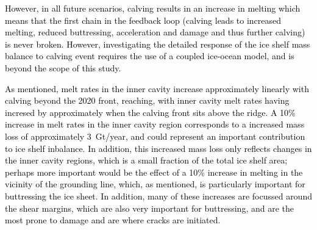 \documentclass[draft]{agujournal2019}
\newcommand{\blue}[1]{\textcolor{blue}{#1}}
\newcommand{\red}[1]{\textcolor{red}{#1}}
\renewcommand{\blue}[1]{{\textcolor{black}{#1}}} %
\renewcommand{\red}[1]{{}} %
\begin{document}
\blue{However, in all future scenarios, calving results in an increase in melting which means that the first chain in the feedback loop (calving leads to increased melting, reduced buttressing, acceleration and damage and thus further calving) is never broken. However, investigating the detailed response of the ice shelf mass balance to calving event requires the use of a coupled ice-ocean model, and is beyond the scope of this study.} 


\red{However, if ice front retreat maintains its pace since 2015, the situation in which the ice front sits above the ridge-crest will be realized in the mid 2020s. Large melt anomalies occur at both the shear margin and near the grounding line when the ice front is retreated to the ridge crest. Assuming that calving fluxes remain unchanged, if the increase in mass loss due to melting after calving to the ridge crest is larger than the resulting increase in flux across the grounding line (that results from buttressing losses after calving), the ice shelf mass balance will reduce, i.e. a calving event that takes the ice front to the ridge crest may lead to further mass loss, representing a positive feedback on ice shelf mass balance. It is important to stress that these feedback arguments are qualitative: investigating the detailed response of the ice shelf mass balance to calving event requires the use of a coupled ice-ocean model, and is beyond the scope of this study.}

\blue{As mentioned, melt rates in the inner cavity increase approximately linearly with calving beyond the 2020 front, reaching, with inner cavity melt rates having incresed by approximately when the calving front sits above the ridge. A 10\% increase in melt rates in the inner cavity region corresponds to a increased mass loss of approximately 3~Gt/year, and could represent an important contribution to ice shelf inbalance. In addition, this increased mass loss only reflects changes in the inner cavity regions, which is a small fraction of the total ice shelf area; perhaps more important would be the effect of a 10\% increase in melting in the vicinity of the grounding line, which, as mentioned, is particularly important for buttressing the ice sheet. In addition, many of these increases are focussed around the shear margins, which are also very important for buttressing, and are the most prone to damage and are where cracks are initiated. }


\end{document}
